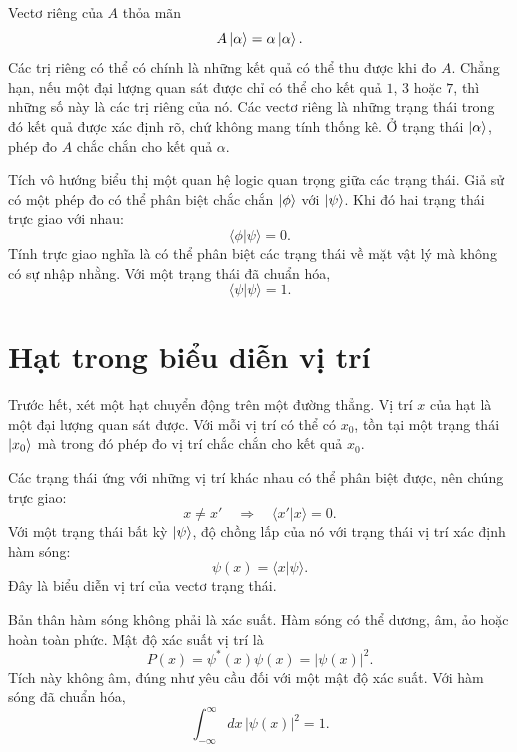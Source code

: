 Vectơ riêng của \(A\) thỏa mãn
\begin{equation}
A\left\lvert\alpha\right\rangle=\alpha\left\lvert\alpha\right\rangle.
\end{equation}
Các trị riêng có thể có chính là những kết quả có thể thu được khi đo \(A\). Chẳng hạn, nếu một đại lượng quan sát được chỉ có thể cho kết quả \(1\), \(3\) hoặc \(7\), thì những số này là các trị riêng của nó. Các vectơ riêng là những trạng thái trong đó kết quả được xác định rõ, chứ không mang tính thống kê. Ở trạng thái \(\left\lvert\alpha\right\rangle\), phép đo \(A\) chắc chắn cho kết quả \(\alpha\).

Tích vô hướng biểu thị một quan hệ logic quan trọng giữa các trạng thái. Giả sử có một phép đo có thể phân biệt chắc chắn \(\left\lvert\phi\right\rangle\) với \(\left\lvert\psi\right\rangle\). Khi đó hai trạng thái trực giao với nhau:
\begin{equation}
\langle\phi|\psi\rangle=0.
\end{equation}
Tính trực giao nghĩa là có thể phân biệt các trạng thái về mặt vật lý mà không có sự nhập nhằng. Với một trạng thái đã chuẩn hóa,
\begin{equation}
\langle\psi|\psi\rangle=1.
\end{equation}

\section{Hạt trong biểu diễn vị trí}

Trước hết, xét một hạt chuyển động trên một đường thẳng. Vị trí \(x\) của hạt là một đại lượng quan sát được. Với mỗi vị trí có thể có \(x_0\), tồn tại một trạng thái \(\left\lvert x_0\right\rangle\) mà trong đó phép đo vị trí chắc chắn cho kết quả \(x_0\).

Các trạng thái ứng với những vị trí khác nhau có thể phân biệt được, nên chúng trực giao:
\begin{equation}
x\neq x'
\quad\Longrightarrow\quad
\langle x'|x\rangle=0.
\end{equation}
Với một trạng thái bất kỳ \(\left\lvert\psi\right\rangle\), độ chồng lấp của nó với trạng thái vị trí xác định hàm sóng:
\begin{equation}
\psi(x)=\langle x|\psi\rangle.
\end{equation}
Đây là biểu diễn vị trí của vectơ trạng thái.

Bản thân hàm sóng không phải là xác suất. Hàm sóng có thể dương, âm, ảo hoặc hoàn toàn phức. Mật độ xác suất vị trí là
\begin{equation}
P(x)=\psi^*(x)\psi(x)=|\psi(x)|^2.
\end{equation}
Tích này không âm, đúng như yêu cầu đối với một mật độ xác suất. Với hàm sóng đã chuẩn hóa,
\begin{equation}
\int_{-\infty}^{\infty}dx\,|\psi(x)|^2=1.
\end{equation}

